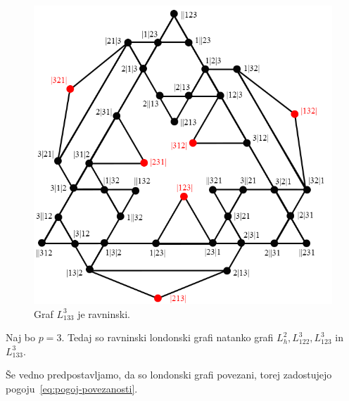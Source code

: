 \documentclass[twoside,11pt]{article}
\begin{document}
\begin{figure}[h]
    \centering
    \includegraphics[width=350pt]{img/L_133.png}
    \caption{Graf $L^3_{133}$ je ravninski.}
    \label{fig:L^3_133}
\end{figure}

\begin{trditev}
    Naj bo $p=3$. Tedaj so ravninski londonski grafi natanko grafi $L_h^2, L_{122}^3, L_{123}^3$ in $L_{133}^3$.
\end{trditev}

\begin{opomba}
    Še vedno predpostavljamo, da so londonski grafi povezani, torej zadostujejo pogoju~\eqref{eq:pogoj-povezanosti}.
\end{opomba}
\end{document}
